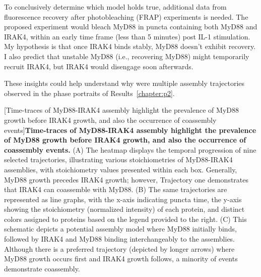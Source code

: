 To conclusively determine which model holds true, additional data from fluorescence recovery after photobleaching (FRAP) experiments is needed. The proposed experiment would bleach MyD88 in puncta containing both MyD88 and IRAK4, within an early time frame (less than 5 minutes) post IL-1 stimulation. My hypothesis is that once IRAK4 binds stably, MyD88 doesn't exhibit recovery. I also predict that unstable MyD88 (i.e., recovering MyD88) might temporarily recruit IRAK4, but IRAK4 would disengage soon afterwards.

These insights could help understand why were multiple assembly trajectories observed in the phase portraits of Results~\ref{chapter:p2}.


\begin{centering}
[Time-traces of MyD88-IRAK4 assembly highlight the prevalence of MyD88 growth before IRAK4 growth, and also the occurrence of coassembly events]{\textbf{Time-traces of MyD88-IRAK4 assembly highlight the prevalence of MyD88 growth before IRAK4 growth, and also the occurrence of coassembly events.} (A) The heatmap displays the temporal progression of nine selected trajectories, illustrating various stoichiometries of MyD88-IRAK4 assemblies, with stoichiometry values presented within each box. Generally, MyD88 growth precedes IRAK4 growth; however, Trajectory one demonstrates that IRAK4 can coassemble with MyD88. (B) The same trajectories are represented as line graphs, with the x-axis indicating puncta time, the y-axis showing the stoichiometry (normalized intensity) of each protein, and distinct colors assigned to proteins based on the legend provided to the right. (C) This schematic depicts a potential assembly model where MyD88 initially binds, followed by IRAK4 and MyD88 binding interchangeably to the assemblies. Although there is a preferred trajectory (depicted by longer arrows) where MyD88 growth occurs first and IRAK4 growth follows, a minority of events demonstrate coassembly.
}
\end{centering}
